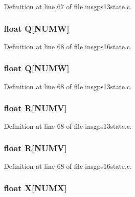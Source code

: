 Definition at line 67 of file insgps13state.\-c.

\hypertarget{group___i_n_s_g_p_s_ga9403e530c40ea2ed78fba00336d98645}{
\subsubsection[{Q}]{\setlength{\rightskip}{0pt plus 5cm}float Q\mbox{[}N\-U\-M\-W\mbox{]}}}\label{group___i_n_s_g_p_s_ga9403e530c40ea2ed78fba00336d98645}


Definition at line 68 of file insgps16state.\-c.

\hypertarget{group___i_n_s_g_p_s_ga9403e530c40ea2ed78fba00336d98645}{
\subsubsection[{Q}]{\setlength{\rightskip}{0pt plus 5cm}float Q\mbox{[}N\-U\-M\-W\mbox{]}}}\label{group___i_n_s_g_p_s_ga9403e530c40ea2ed78fba00336d98645}


Definition at line 68 of file insgps13state.\-c.

\hypertarget{group___i_n_s_g_p_s_ga06fb8e491fbcc3c8cbe00ccaa0aa1aa7}{
\subsubsection[{R}]{\setlength{\rightskip}{0pt plus 5cm}float R\mbox{[}N\-U\-M\-V\mbox{]}}}\label{group___i_n_s_g_p_s_ga06fb8e491fbcc3c8cbe00ccaa0aa1aa7}


Definition at line 68 of file insgps13state.\-c.

\hypertarget{group___i_n_s_g_p_s_ga06fb8e491fbcc3c8cbe00ccaa0aa1aa7}{
\subsubsection[{R}]{\setlength{\rightskip}{0pt plus 5cm}float R\mbox{[}N\-U\-M\-V\mbox{]}}}\label{group___i_n_s_g_p_s_ga06fb8e491fbcc3c8cbe00ccaa0aa1aa7}


Definition at line 68 of file insgps16state.\-c.

\hypertarget{group___i_n_s_g_p_s_ga878335db1805364cefebddb5eccfc282}{
\subsubsection[{X}]{\setlength{\rightskip}{0pt plus 5cm}float X\mbox{[}N\-U\-M\-X\mbox{]}}}\label{group___i_n_s_g_p_s_ga878335db1805364cefebddb5eccfc282}



